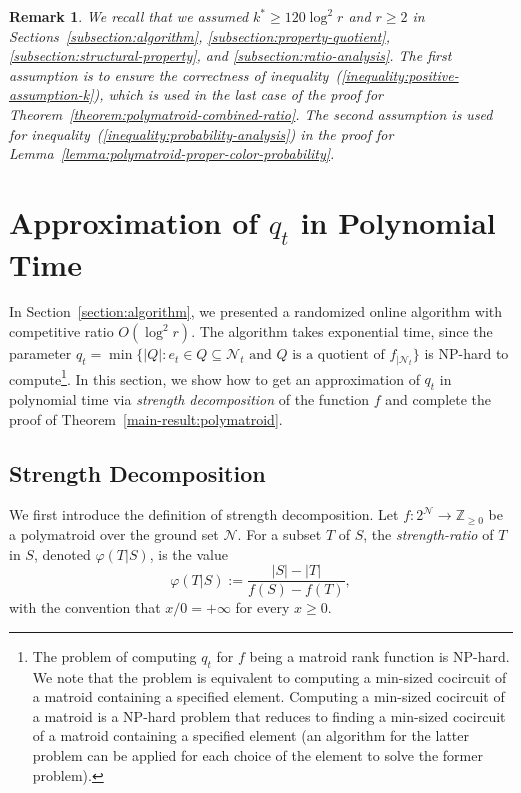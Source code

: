 \documentclass[11pt]{article}
\newtheorem{remark}{Remark}
\theoremstyle{definition}
\begin{document}
\begin{remark}
    We recall that we assumed $k^*\geq 120\log^2 r$ and $r\geq 2$ in Sections~\ref{subsection:algorithm}, \ref{subsection:property-quotient}, \ref{subsection:structural-property}, and \ref{subsection:ratio-analysis}. The first assumption is to ensure the correctness of inequality~(\ref{inequality:positive-assumption-k}), which is used in the last case of the proof for Theorem~\ref{theorem:polymatroid-combined-ratio}. The second assumption is used for inequality~(\ref{inequality:probability-analysis}) in the proof for Lemma~\ref{lemma:polymatroid-proper-color-probability}.
\end{remark} \section{Approximation of $q_t$ in Polynomial Time}\label{section:poly-algorithm}
In Section~\ref{section:algorithm}, we presented a randomized online algorithm with competitive ratio $O(\log^2 r)$. The algorithm takes exponential time, since the parameter $q_t=\min \{|Q|: e_t\in Q \subseteq \mathcal{N}_t \text{ and $Q$ is a quotient of $f_{|\mathcal{N}_t}$}\}$ is NP-hard to compute\footnote{The problem of computing $q_t$ for $f$ being a matroid rank function is NP-hard. We note that the problem is equivalent to computing a min-sized cocircuit of a matroid containing a specified element. Computing a min-sized cocircuit of a matroid is a NP-hard problem \cite{Var97} that reduces to finding a min-sized cocircuit of a matroid containing a specified element (an algorithm for the latter problem can be applied for each choice of the element to solve the former problem).}. In this section, we show how to get an approximation of $q_t$ in polynomial time via \emph{strength decomposition} of the function $f$ and complete the proof of Theorem~\ref{main-result:polymatroid}.

\subsection{Strength Decomposition}
We first introduce the definition of strength decomposition. Let $f:2^\mathcal{N}\rightarrow \mathbb{Z}_{\geq 0}$ be a polymatroid over the ground set $\mathcal{N}$. For a subset $T$ of $S$, the \emph{strength-ratio} of $T$ in $S$, denoted $\varphi(T|S)$, is the value
$$\varphi(T|S):=\frac{|S|-|T|}{f(S)-f(T)},$$
with the convention that $x/0=+\infty$ for every $x\geq 0$.
\end{document}

